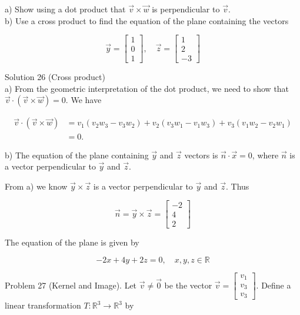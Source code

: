 \documentclass[10pt]{article}
\begin{document}
a) Show using a dot product that $\vec{v} \times \vec{w}$ is perpendicular to $\vec{v}$.\\
b) Use a cross product to find the equation of the plane containing the vectors

$$
\vec{y}=\left[\begin{array}{l}
1 \\
0 \\
1
\end{array}\right], \quad \vec{z}=\left[\begin{array}{c}
1 \\
2 \\
-3
\end{array}\right]
$$

Solution 26 (Cross product)\\
a) From the geometric interpretation of the dot product, we need to show that $\vec{v} \cdot(\vec{v} \times \vec{w})=0$. We have

$$
\begin{aligned}
\vec{v} \cdot(\vec{v} \times \vec{w}) & =v_{1}\left(v_{2} w_{3}-v_{3} w_{2}\right)+v_{2}\left(v_{3} w_{1}-v_{1} w_{3}\right)+v_{3}\left(v_{1} w_{2}-v_{2} w_{1}\right) \\
& =0 .
\end{aligned}
$$

b) The equation of the plane containing $\vec{y}$ and $\vec{z}$ vectors is $\vec{n} \cdot \vec{x}=0$, where $\vec{n}$ is a vector perpendicular to $\vec{y}$ and $\vec{z}$.

From a) we know $\vec{y} \times \vec{z}$ is a vector perpendicular to $\vec{y}$ and $\vec{z}$. Thus

$$
\vec{n}=\vec{y} \times \vec{z}=\left[\begin{array}{c}
-2 \\
4 \\
2
\end{array}\right]
$$

The equation of the plane is given by

$$
-2 x+4 y+2 z=0, \quad x, y, z \in \mathbb{R}
$$

Problem 27 (Kernel and Image). Let $\vec{v} \neq \overrightarrow{0}$ be the vector $\vec{v}=\left[\begin{array}{c}v_{1} \\ v_{3} \\ v_{3}\end{array}\right]$. Define a linear transformation $T: \mathbb{R}^{3} \rightarrow \mathbb{R}^{3}$ by
\end{document}
